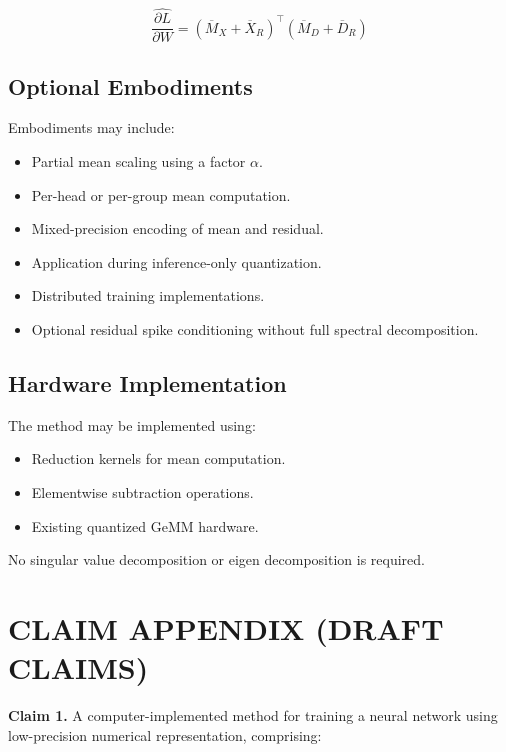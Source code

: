 \documentclass[12pt]{article}
\begin{document}
\[
\widehat{\frac{\partial L}{\partial W}} = (\overline{M}_X + \overline{X}_R)^\top (\overline{M}_D + \overline{D}_R)
\]

\subsection{Optional Embodiments}

Embodiments may include:

\begin{itemize}
    \item Partial mean scaling using a factor $\alpha$.
    \item Per-head or per-group mean computation.
    \item Mixed-precision encoding of mean and residual.
    \item Application during inference-only quantization.
    \item Distributed training implementations.
    \item Optional residual spike conditioning without full spectral decomposition.
\end{itemize}

\subsection{Hardware Implementation}

The method may be implemented using:

\begin{itemize}
    \item Reduction kernels for mean computation.
    \item Elementwise subtraction operations.
    \item Existing quantized GeMM hardware.
\end{itemize}

No singular value decomposition or eigen decomposition is required.

\newpage

\section*{CLAIM APPENDIX (DRAFT CLAIMS)}

\textbf{Claim 1.} A computer-implemented method for training a neural network using low-precision numerical representation, comprising:
\end{document}
